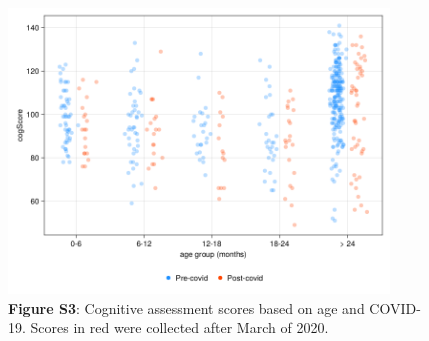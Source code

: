 \documentclass{article}
\begin{document}
\begin{figure}[!htb]
    \centering
    \includegraphics[width=0.9\textwidth]{assets/Supp_Figure3.png}
    \captionsetup{labelformat=empty}
    \caption{
        \textbf{Figure S3}: Cognitive assessment scores based on age
        and COVID-19. Scores in red were collected after March of 2020.
    }
\end{figure}
\end{document}

